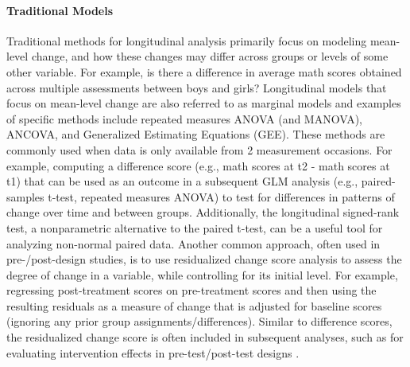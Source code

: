 \documentclass[
  number,
  preprint,
  3p,
  twocolumn]{elsarticle}
\let\oldparagraph\paragraph
\renewcommand{\paragraph}[1]{\oldparagraph{#1}\mbox{}}
\begin{document}
\hypertarget{traditional-models}{%
\paragraph{Traditional Models}\label{traditional-models}}

Traditional methods for longitudinal analysis primarily focus on
modeling mean-level change, and how these changes may differ across
groups or levels of some other variable. For example, is there a
difference in average math scores obtained across multiple assessments
between boys and girls? Longitudinal models that focus on mean-level
change are also referred to as marginal models and examples of specific
methods include repeated measures ANOVA (and MANOVA), ANCOVA, and
Generalized Estimating Equations (GEE). These methods are commonly used
when data is only available from 2 measurement occasions. For example,
computing a difference score (e.g., math scores at t2 - math scores at
t1) that can be used as an outcome in a subsequent GLM analysis (e.g.,
paired-samples t-test, repeated measures ANOVA) to test for differences
in patterns of change over time and between groups. Additionally, the
longitudinal signed-rank test, a nonparametric alternative to the paired
t-test, can be a useful tool for analyzing non-normal paired data.
Another common approach, often used in pre-/post-design studies, is to
use residualized change score analysis to assess the degree of change in
a variable, while controlling for its initial level. For example,
regressing post-treatment scores on pre-treatment scores and then using
the resulting residuals as a measure of change that is adjusted for
baseline scores (ignoring any prior group assignments/differences).
Similar to difference scores, the residualized change score is often
included in subsequent analyses, such as for evaluating intervention
effects in pre-test/post-test designs \citep{kisbu2013}.
\end{document}
